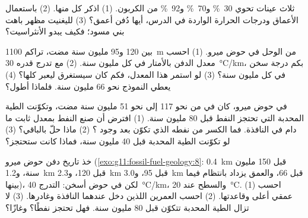 \begin{exercise}[$\star\star$]\label{exo:g11:fossil-fuel-geology:11}
ثلاث عينات  تحوي \qty{30}{\percent} و\qty{70}{\percent}
و\qty{92}{\percent} من الكربون. (1) اذكر  كل منها. (2) باستعمال
الأعماق ودرجات الحرارة الواردة في الدرس، أيها دُفن أعمق؟
(3) لليغنيت مظهر باهت بني مسود؛ فكيف يبدو الأنثراسيت؟
\end{exercise}

\begin{exercise}[$\star\star\star$]\label{exo:g11:fossil-fuel-geology:12}
بين 120 و95 مليون سنة مضت، تراكم \qty{1100}{m} من الوحل في
حوض ميرو. (1) احسب معدل الدفن بالأمتار في كل مليون سنة.
(2) مع تدرج قدره \qty{30}{\degreeCelsius/km}، بكم درجة
سخن  في كل مليون سنة؟ (3) لو استمر هذا المعدل، فكم
كان سيستغرق  ليعبر  كلها؟ (4) يعطي
النموذج نحو 66 مليون سنة. فلماذا أطول؟
\end{exercise}

\begin{exercise}[$\star\star\star$]\label{exo:g11:fossil-fuel-geology:13}
في حوض ميرو، كان  في  من نحو 117
إلى نحو 51 مليون سنة مضت، وتكوّنت الطية المحدبة التي تحتجز النفط
قبل 80 مليون سنة. (1) افترض أن  صنع النفط بمعدل ثابت
ما دام في النافذة. فما الكسر من نفطه الذي تكوّن بعد وجود
؟ (2) ماذا حلّ بالباقي؟ (3) لو تكوّنت الطية المحدبة قبل 40
مليون سنة، فماذا كانت ستحتجز؟
\end{exercise}

\begin{exercise}[$\star\star\star$]\label{exo:g11:fossil-fuel-geology:14}
خذ تاريخ دفن حوض ميرو (\cref{exo:g11:fossil-fuel-geology:8}:
\qty{0.4}{km} قبل 150 مليون سنة، و\qty{1.2}{km} قبل 120، و\qty{2.3}{km}
قبل 95، و\qty{3.0}{km} قبل 66، والعمق يزداد بانتظام فيما بينها)، لكن في
حوض أسخن: التدرج \qty{40}{\degreeCelsius/km}، والسطح عند
\qty{20}{\degreeCelsius}. (1) احسب عمقي أعلى  وقاعدتها.
(2) احسب العمرين اللذين دخل عندهما  النافذة
وغادرها. (3) لا تزال الطية المحدبة تتكوّن قبل 80 مليون سنة. فهل
تحتجز نفطًا؟ وغازًا؟
\end{exercise}

